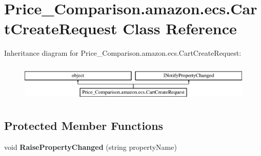 \hypertarget{class_price___comparison_1_1amazon_1_1ecs_1_1_cart_create_request}{\section{Price\-\_\-\-Comparison.\-amazon.\-ecs.\-Cart\-Create\-Request Class Reference}
\label{class_price___comparison_1_1amazon_1_1ecs_1_1_cart_create_request}
}


 


Inheritance diagram for Price\-\_\-\-Comparison.\-amazon.\-ecs.\-Cart\-Create\-Request\-:\begin{figure}[H]
\begin{center}
\leavevmode
\includegraphics[height=1.836066cm]{class_price___comparison_1_1amazon_1_1ecs_1_1_cart_create_request}
\end{center}
\end{figure}
\subsection*{Protected Member Functions}
\begin{DoxyCompactItemize}
\item 
\hypertarget{class_price___comparison_1_1amazon_1_1ecs_1_1_cart_create_request_addd33b89161a5c3615b8df69852beb73}{void {\bfseries Raise\-Property\-Changed} (string property\-Name)}\label{class_price___comparison_1_1amazon_1_1ecs_1_1_cart_create_request_addd33b89161a5c3615b8df69852beb73}

\end{DoxyCompactItemize}
